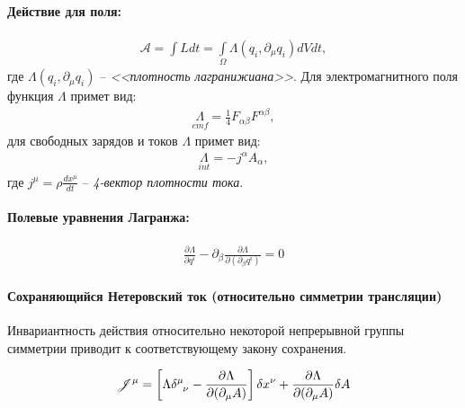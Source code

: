 \documentclass[__minimum__.tex]{subfiles}
\begin{document}
\paragraph{Действие для поля:}
\begin{gather}
    \mathscr{A}
    =
    \int{Ldt}
    =
    \int\limits_{\Omega}\Lambda(q_{i},\partial_{\mu}q_{i}){dV}{dt},
\end{gather}
где $\Lambda(q_{i},\partial_{\mu}q_{i})$ -- \emph{<<плотность лагранижиана>>}. Для электромагнитного поля функция $\Lambda$ примет вид:
\begin{gather}
    \underset{emf}\Lambda
    =
    \frac{1}{4}F_{\alpha\beta}F^{\alpha\beta},
    \label{p:lemf}
\end{gather}
для свободных зарядов и токов $\Lambda$ примет вид:
\begin{gather}
    \underset{int}\Lambda
    =
    -j^{\alpha}A_{\alpha},
\end{gather}
где $j^\mu=\rho\frac{dx^{\mu}}{dt}$ -- \emph{4-вектор плотности тока}.

\paragraph{Полевые уравнения Лагранжа:}
\begin{gather}
    \frac{\partial{\Lambda}}{\partial{q^{i}}}
    -
    \partial_\beta\frac{\partial\Lambda}{\partial(\partial_\beta{q^i})}
    =
    0
\end{gather}

\paragraph{Сохраняющийся Нетеровский ток (относительно симметрии трансляции)}

\begin{theorem}[Нётер]
    Инвариантность действия относительно некоторой непрерывной группы симметрии приводит к соответствующему закону сохранения.
\end{theorem}

\begin{gather}
    \mathscr{J}^{\mu}
    =
    \left[
        \Lambda\delta\indices{^\mu_\nu}
        -
        \frac{\partial\Lambda}{\partial(\partial_\mu{A})}
        \right]\delta{x^\nu}
    +
    \frac{\partial\Lambda}{\partial(\partial_\mu{A})}
    \delta{A}
\end{gather}
\end{document}
